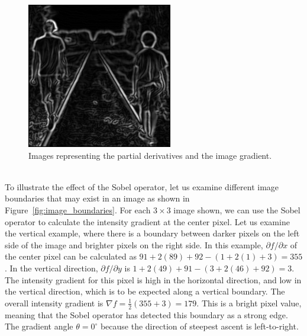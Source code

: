 \documentclass[epsfig,10pt,fullpage]{article}
\begin{document}
\begin{figure}[h]
\begin{minipage}[b]{0.32\textwidth}
\end{minipage}
\hfill
\begin{minipage}[b]{0.32\textwidth}
   \includegraphics[width=\textwidth]{figures/fig_stage3_sobel.png}
\end{minipage}
   \caption{Images representing the partial derivatives and the image gradient.}
	\label{fig:sample_stage3}
\end{figure}

~\\
\noindent
To illustrate the effect of the Sobel operator, let us examine different image boundaries that 
may exist in an image as shown in Figure~\ref{fig:image_boundaries}. For each $3 \times 3$
image shown, we can use the Sobel operator to calculate the intensity gradient at the center 
pixel. Let us examine the vertical example, where there is a boundary between darker 
pixels on the left side of the image and brighter pixels on the right side. In this 
example, ${\partial{f}}/{\partial{x}}$ of the center pixel can be calculated as 
$91 + 2(89) + 92 - (1 + 2(1) + 3) = 355$. In the vertical direction, ${\partial{f}}/{\partial{y}}$
is $1 + 2(49) + 91 -(3 + 2(46) + 92) = 3$. The intensity gradient for 
this pixel is high in the horizontal direction, and low in the vertical direction, which is to 
be expected along a vertical boundary. The overall intensity gradient is
$\nabla{f} = \frac{1}{2}(355 + 3) = 179$. This is a bright pixel value, meaning that
the Sobel operator has detected this boundary as a strong edge. The gradient angle $\theta
= 0^\circ$ because the direction of steepest ascent is left-to-right.
\end{document}
